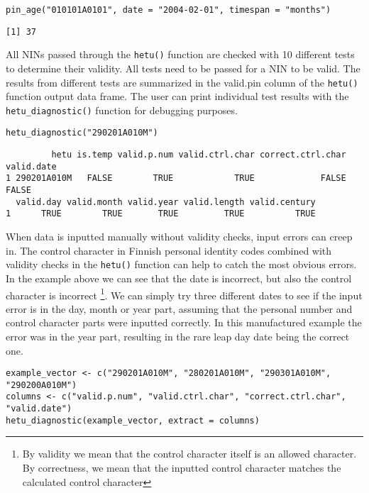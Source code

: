 \begin{verbatim}
pin_age("010101A0101", date = "2004-02-01", timespan = "months")
\end{verbatim}

\begin{verbatim}
[1] 37
\end{verbatim}

All NINs passed through the \texttt{hetu()} function are checked with 10 different tests to determine their validity. All tests need to be passed for a NIN to be valid. The results from different tests are summarized in the valid.pin column of the \texttt{hetu()} function output data frame. The user can print individual test results with the \texttt{hetu\_diagnostic()} function for debugging purposes.

\begin{verbatim}
hetu_diagnostic("290201A010M")
\end{verbatim}

\begin{verbatim}
         hetu is.temp valid.p.num valid.ctrl.char correct.ctrl.char valid.date
1 290201A010M   FALSE        TRUE            TRUE             FALSE      FALSE
  valid.day valid.month valid.year valid.length valid.century
1      TRUE        TRUE       TRUE         TRUE          TRUE
\end{verbatim}

When data is inputted manually without validity checks, input errors can creep in. The control character in Finnish personal identity codes combined with validity checks in the \texttt{hetu()} function can help to catch the most obvious errors. In the example above we can see that the date is incorrect, but also the control character is incorrect \footnote{By validity we mean that the control character itself is an allowed character. By correctness, we mean that the inputted control character matches the calculated control character}. We can simply try three different dates to see if the input error is in the day, month or year part, assuming that the personal number and control character parts were inputted correctly. In this manufactured example the error was in the year part, resulting in the rare leap day date being the correct one.

\begin{verbatim}
example_vector <- c("290201A010M", "280201A010M", "290301A010M", "290200A010M")
columns <- c("valid.p.num", "valid.ctrl.char", "correct.ctrl.char", "valid.date")
hetu_diagnostic(example_vector, extract = columns)
\end{verbatim}

